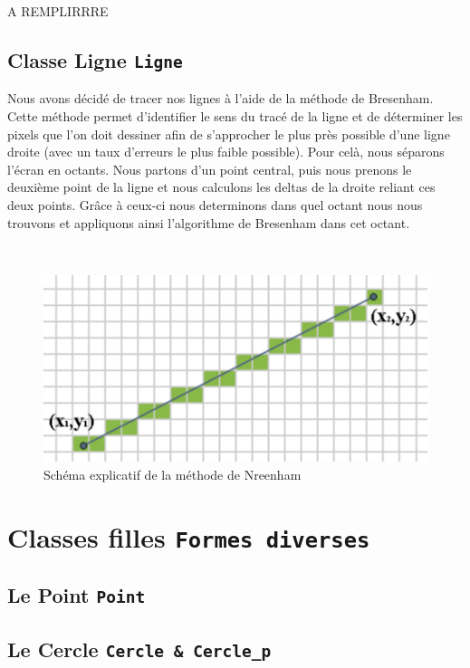 \documentclass[11pt]{article}
\begin{document}
A REMPLIRRRE

\clearpage

\subsection{Classe Ligne \texttt{Ligne}}

Nous avons décidé de tracer nos lignes à l'aide de la méthode de Bresenham. Cette méthode permet d’identifier le sens du tracé de la ligne et de déterminer les pixels que l'on doit dessiner afin de s'approcher le plus près possible d'une ligne droite (avec un taux d'erreurs le plus faible possible). Pour celà, nous séparons l'écran en octants. Nous partons d'un point central, puis nous prenons le deuxième point de la ligne et nous calculons les deltas de la droite reliant ces deux points. Grâce à ceux-ci nous determinons dans quel octant nous nous trouvons et appliquons ainsi l'algorithme de Bresenham dans cet octant. 

\
\

\begin{figure}[!htbp]
    \begin{center}
        \includegraphics[width=13cm]{Photo3.png}
        \caption{Schéma explicatif de la méthode de Nreenham}
    \centering
    \end{center}
\end{figure}

\clearpage
\section{Classes filles \texttt{Formes diverses}}

\subsection{Le Point \texttt{Point}}

\subsection{Le Cercle \texttt{Cercle \& Cercle\_p}}
\end{document}
